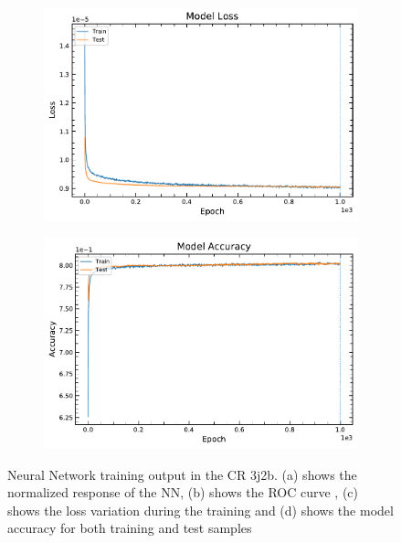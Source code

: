 \begin{figure}[!h]
\begin{subfigure}[b]{0.5\linewidth}
    \caption{} 
    \label{CR:3j2b:ROC} 
  \end{subfigure} 
  \vspace*{-0.4cm}
  \begin{subfigure}[b]{0.5\linewidth}
    \centering
    \includegraphics[width=\linewidth]{ubonn-thesis/Chapters/Chapters_06/Figure/CR_3j2b/loss_PLV_3j2b_L27_20_10_06Oct2021.pdf} %
    \caption{} 
    \label{CR:3j2b:loss} 
  \end{subfigure}%
  \begin{subfigure}[b]{0.5\linewidth}
    \centering
    \includegraphics[width=\linewidth]{ubonn-thesis/Chapters/Chapters_06/Figure/CR_3j2b/acc_PLV_3j2b_L27_20_10_06Oct2021.pdf} 
    \caption{} 
    \label{CR:3j2b:acc} 
  \end{subfigure} 
  \vspace*{-0.3cm}
  \caption{Neural Network training output in the CR 3j2b. (a) shows the normalized response of the NN, (b) shows the ROC curve , (c) shows the loss variation during the training and (d) shows the model accuracy for both training and test samples}
  \label{CR:3j2b:NN} 
\end{figure}

